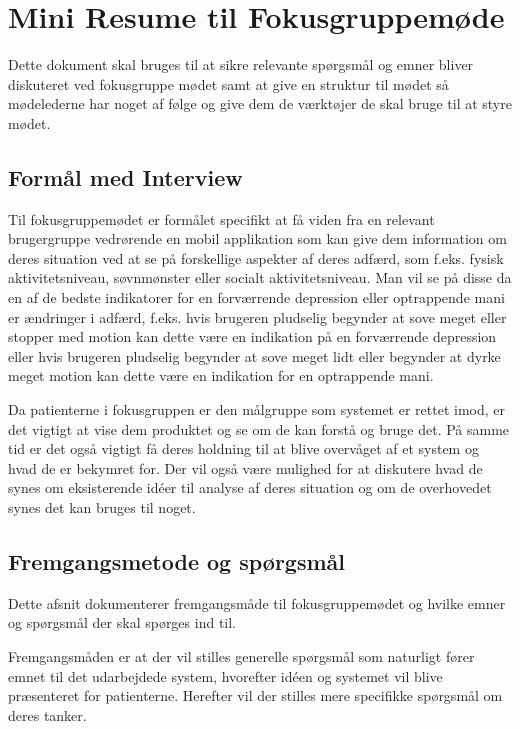 \chapter{Mini Resume til Fokusgruppemøde}
Dette dokument skal bruges til at sikre relevante spørgsmål og emner bliver diskuteret ved fokusgruppe mødet samt at give en struktur til mødet så mødelederne har noget af følge og give dem de værktøjer de skal bruge til at styre mødet.

\section{Formål med Interview}
Til fokusgruppemødet er formålet specifikt at få viden fra en relevant brugergruppe vedrørende en mobil applikation som kan give dem information om deres situation ved at se på forskellige aspekter af deres adfærd, som f.eks. fysisk aktivitetsniveau, søvnmønster eller socialt aktivitetsniveau. 
Man vil se på disse da en af de bedste indikatorer for en forværrende depression eller optrappende mani er ændringer i adfærd, f.eks. hvis brugeren pludselig begynder at sove meget eller stopper med motion kan dette være en indikation på en forværrende depression eller hvis brugeren pludselig begynder at sove meget lidt eller begynder at dyrke meget motion kan dette være en indikation for en optrappende mani.
 
Da patienterne i fokusgruppen er den målgruppe som systemet er rettet imod, er det vigtigt at vise dem produktet og se om de kan forstå og bruge det.
På samme tid er det også vigtigt få deres holdning til at blive overvåget af et system og hvad de er bekymret for.
Der vil også være mulighed for at diskutere hvad de synes om eksisterende idéer til analyse af deres situation og om de overhovedet synes det kan bruges til noget.

\section{Fremgangsmetode og spørgsmål}
Dette afsnit dokumenterer fremgangsmåde til fokusgruppemødet og hvilke emner og spørgsmål der skal spørges ind til.

Fremgangsmåden er at der vil stilles generelle spørgsmål som naturligt fører emnet til det udarbejdede system, hvorefter idéen og systemet vil blive præsenteret for patienterne. Herefter vil der stilles mere specifikke spørgsmål om deres tanker.

